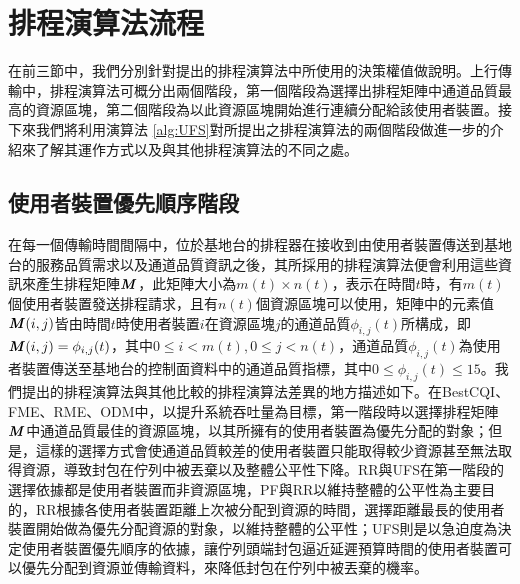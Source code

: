 \section{排程演算法流程}
在前三節中，我們分別針對提出的排程演算法中所使用的決策權值做說明。上行傳輸中，排程演算法可概分出兩個階段，第一個階段為選擇出排程矩陣中通道品質最高的資源區塊，第二個階段為以此資源區塊開始進行連續分配給該使用者裝置。接下來我們將利用演算法 \ref{alg:UFS}對所提出之排程演算法的兩個階段做進一步的介紹來了解其運作方式以及與其他排程演算法的不同之處。
\subsection{使用者裝置優先順序階段}
在每一個傳輸時間間隔中，位於基地台的排程器在接收到由使用者裝置傳送到基地台的服務品質需求以及通道品質資訊之後，其所採用的排程演算法便會利用這些資訊來產生排程矩陣$\textbf{\textit{M}}$，此矩陣大小為$m(t)\times n(t)$，表示在時間$t$時，有$m(t)$個使用者裝置發送排程請求，且有$n(t)$個資源區塊可以使用，矩陣中的元素值$\textbf{\textit{M}}(i,j)$皆由時間$t$時使用者裝置$i$在資源區塊$j$的通道品質$\phi_{i,j}(t)$所構成，即$\textbf{\textit{M}}(i,j)=\phi_{i,j}(t)$，其中$0\leq i<m(t) , 0\leq j<n(t)$，通道品質$\phi_{i,j}(t)$為使用者裝置傳送至基地台的控制面資料中的通道品質指標，其中$0\leq \phi_{i,j}(t)\leq 15$。我們提出的排程演算法與其他比較的排程演算法差異的地方描述如下。在BestCQI、FME、RME、ODM中，以提升系統吞吐量為目標，第一階段時以選擇排程矩陣$\textbf{\textit{M}}$中通道品質最佳的資源區塊，以其所擁有的使用者裝置為優先分配的對象；但是，這樣的選擇方式會使通道品質較差的使用者裝置只能取得較少資源甚至無法取得資源，導致封包在佇列中被丟棄以及整體公平性下降。RR與UFS在第一階段的選擇依據都是使用者裝置而非資源區塊，PF與RR以維持整體的公平性為主要目的，RR根據各使用者裝置距離上次被分配到資源的時間，選擇距離最長的使用者裝置開始做為優先分配資源的對象，以維持整體的公平性；UFS則是以急迫度為決定使用者裝置優先順序的依據，讓佇列頭端封包逼近延遲預算時間的使用者裝置可以優先分配到資源並傳輸資料，來降低封包在佇列中被丟棄的機率。

